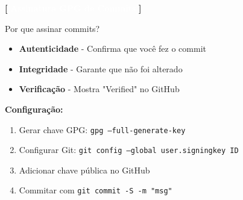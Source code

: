 \documentclass[10pt, brazil]{beamer}
\begin{document}
\begin{frame}{\textcolor{lightpurple}{\textbf{[}} \textbf{\textcolor{white}{Assinatura GPG de Commits}} \textcolor{lightpurple}{\textbf{]}}}
  
  \begin{block}{Por que assinar commits?}
    \begin{itemize}
      \item \textbf{Autenticidade} - Confirma que você fez o commit
      \item \textbf{Integridade} - Garante que não foi alterado
      \item \textbf{Verificação} - Mostra "Verified" no GitHub
    \end{itemize}
  \end{block}

  \vspace{1em}

  \textbf{Configuração:}
  \begin{enumerate}
    \item Gerar chave GPG: \texttt{gpg --full-generate-key}
    \item Configurar Git: \texttt{git config --global user.signingkey ID}
    \item Adicionar chave pública no GitHub
    \item Commitar com \texttt{git commit -S -m "msg"}
  \end{enumerate}

\end{frame}
\end{document}
